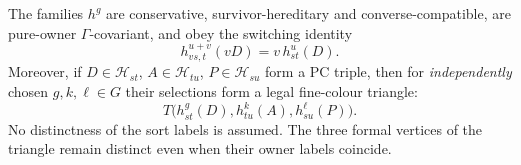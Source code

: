 \begin{proposition}
\label{prop:moving-readings}
The families $h^g$ are conservative, survivor-hereditary and
converse-compatible, are pure-owner $\Gamma$-covariant, and
obey the switching identity
\begin{equation}\label{eq:reading-switch}
    h^{u+v}_{vs,t}(vD)=v\,h^u_{st}(D).
\end{equation}
Moreover, if $D\in\mathcal H_{st}$, $A\in\mathcal H_{tu}$,
$P\in\mathcal H_{su}$ form a PC triple, then for
\emph{independently} chosen $g,k,\ell\in G$ their selections
form a legal fine-colour triangle:
\begin{equation}\label{eq:reading-rectangular}
   T\bigl(h^g_{st}(D),h^k_{tu}(A),h^\ell_{su}(P)\bigr).
\end{equation}
No distinctness of the sort labels is assumed.  The three
formal vertices of the triangle remain distinct even when their
owner labels coincide.
\end{proposition}
